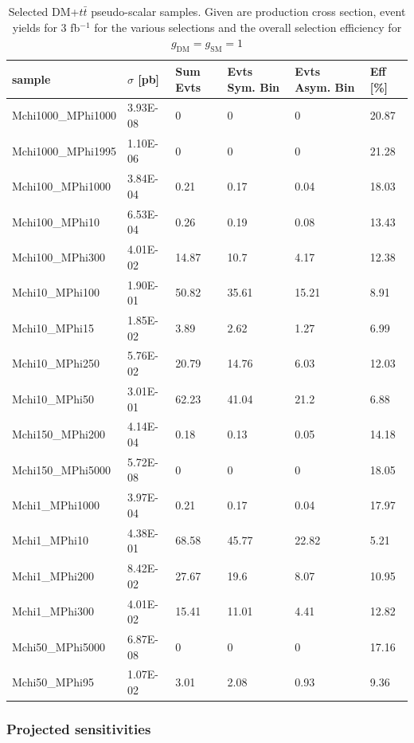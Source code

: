 \begin{table}[h!]
\small
\centering
\begin{tabular}{l|lllll}
\hline
sample             & $\sigma$ [pb] & Sum Evts       & Evts Sym. Bin & Evts Asym. Bin & Eff  [\%]   \\\hline
Mchi1000\_MPhi1000 & 3.93E-08 & 0     & 0     & 0     & 20.87 \\
Mchi1000\_MPhi1995 & 1.10E-06 & 0     & 0     & 0     & 21.28 \\
Mchi100\_MPhi1000  & 3.84E-04 & 0.21  & 0.17  & 0.04  & 18.03 \\
Mchi100\_MPhi10    & 6.53E-04 & 0.26  & 0.19  & 0.08  & 13.43 \\
Mchi100\_MPhi300   & 4.01E-02 & 14.87 & 10.7  & 4.17  & 12.38 \\
Mchi10\_MPhi100    & 1.90E-01 & 50.82 & 35.61 & 15.21 & 8.91  \\
Mchi10\_MPhi15     & 1.85E-02 & 3.89  & 2.62  & 1.27  & 6.99  \\
Mchi10\_MPhi250    & 5.76E-02 & 20.79 & 14.76 & 6.03  & 12.03 \\
Mchi10\_MPhi50     & 3.01E-01 & 62.23 & 41.04 & 21.2  & 6.88  \\
Mchi150\_MPhi200   & 4.14E-04 & 0.18  & 0.13  & 0.05  & 14.18 \\
Mchi150\_MPhi5000  & 5.72E-08 & 0     & 0     & 0     & 18.05 \\
Mchi1\_MPhi1000    & 3.97E-04 & 0.21  & 0.17  & 0.04  & 17.97 \\
Mchi1\_MPhi10      & 4.38E-01 & 68.58 & 45.77 & 22.82 & 5.21  \\
Mchi1\_MPhi200     & 8.42E-02 & 27.67 & 19.6  & 8.07  & 10.95 \\
Mchi1\_MPhi300     & 4.01E-02 & 15.41 & 11.01 & 4.41  & 12.82 \\
Mchi50\_MPhi5000   & 6.87E-08 & 0     & 0     & 0     & 17.16 \\
Mchi50\_MPhi95     & 1.07E-02 & 3.01  & 2.08  & 0.93  & 9.36 \\
\hline
\end{tabular}
\caption{Selected DM+$t\bar{t}$ pseudo-scalar samples. Given are production cross section, event yields for 3 fb$^{-1 }$ for the various selections and the overall selection efficiency for $g_\textrm{DM}=g_\textrm{SM}=1$ \label{tab:dmtt_P}}
\end{table}



\clearpage
\subsubsection{Projected sensitivities}

